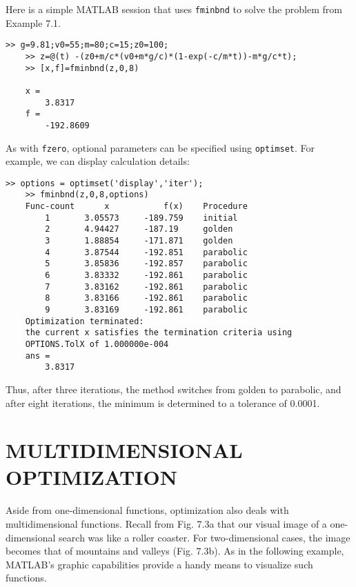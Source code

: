 \documentclass[../main.tex]{subfiles}
\begin{document}
Here is a simple MATLAB session that uses \texttt{fminbnd} to solve the problem from Example 7.1.

\begin{lstlisting}[numbers=none,frame=none]
	>> g=9.81;v0=55;m=80;c=15;z0=100;
	>> z=@(t) -(z0+m/c*(v0+m*g/c)*(1-exp(-c/m*t))-m*g/c*t);
	>> [x,f]=fminbnd(z,0,8)

	x =
		3.8317
	f =
		-192.8609
\end{lstlisting}

As with \texttt{fzero}, optional parameters can be specified using \texttt{optimset}. For example,
we can display calculation details:

\begin{lstlisting}[numbers=none,frame=none]
	>> options = optimset('display','iter');
	>> fminbnd(z,0,8,options)
	Func-count 		x 			f(x) 	Procedure
		1 		3.05573 	-189.759 	initial
		2 		4.94427 	-187.19 	golden
		3 		1.88854 	-171.871 	golden
		4 		3.87544 	-192.851 	parabolic
		5 		3.85836 	-192.857 	parabolic
		6 		3.83332		-192.861 	parabolic
		7 		3.83162 	-192.861 	parabolic
		8 		3.83166 	-192.861 	parabolic
		9 		3.83169 	-192.861 	parabolic
	Optimization terminated:
	the current x satisfies the termination criteria using
	OPTIONS.TolX of 1.000000e-004
	ans =
		3.8317
\end{lstlisting}

Thus, after three iterations, the method switches from golden to parabolic, and after eight
iterations, the minimum is determined to a tolerance of 0.0001.\\

\section{MULTIDIMENSIONAL OPTIMIZATION}
\label{sec:sec_7_3}

\noindent Aside from one-dimensional functions, optimization also deals with multidimensional
functions. Recall from Fig. 7.3a that our visual image of a one-dimensional search was like
a roller coaster. For two-dimensional cases, the image becomes that of mountains and
valleys (Fig. 7.3b). As in the following example, MATLAB's graphic capabilities provide
a handy means to visualize such functions.
\end{document}
